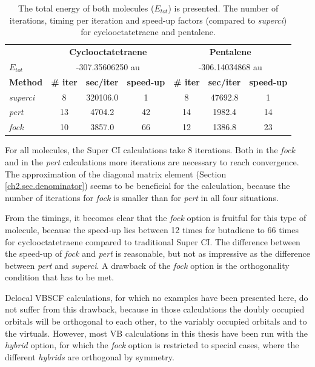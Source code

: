 \begin{table}[htbp]
\caption{The total energy of both molecules ($E_{tot}$) is presented. The number of iterations, timing per iteration and speed-up factors (compared to \textit{superci}) for cyclooctatetraene and pentalene.}
\begin{center}
\begin{tabular}{l c c c c c c}
\hline
&\multicolumn{3}{c}{\textbf{Cyclooctatetraene}}&\multicolumn{3}{c}{\textbf{Pentalene}}\\
$E_{tot}$&\multicolumn{3}{c}{-307.35606250 au}&\multicolumn{3}{c}{-306.14034868 au}\\
\textbf{Method}&\textbf{\# iter}&\textbf{sec/iter}&\textbf{speed-up}&\textbf{\# iter}&\textbf{sec/iter}&\textbf{speed-up}\\
\hline
\textit{superci}&8&320106.0&1&8&47692.8&1\\
\textit{pert}&13&4704.2&42&14&1982.4&14\\
\textit{fock}&10&3857.0&66&12&1386.8&23\\
\end{tabular}
\label{ch2.tab.flat2}
\end{center}
\end{table}

For all molecules, the Super CI calculations take 8 iterations. Both in the \textit{fock} and in the \textit{pert} calculations more iterations are necessary to reach convergence. The approximation of the diagonal matrix element (Section \ref{ch2.sec.denominator}) seems to be beneficial for the calculation, because the number of iterations for \textit{fock} is smaller than for \textit{pert} in all four situations.

From the timings, it becomes clear that the \textit{fock} option is fruitful for this type of molecule, because the speed-up lies between 12 times for butadiene to 66 times for cyclooctatetraene compared to traditional Super CI. The difference between the speed-up of \textit{fock} and \textit{pert} is reasonable, but not as impressive as the difference between \textit{pert} and \textit{superci}. A drawback of the \textit{fock} option is the orthogonality condition that has to be met. 

Delocal VBSCF calculations, for which no examples have been presented here, do not suffer from this drawback, because in those calculations the doubly occupied orbitals will be orthogonal to each other, to the variably occupied orbitals and to the virtuals. However, most VB calculations in this thesis have been run with the \textit{hybrid} option, for which the \textit{fock} option is restricted to special cases, where the different \textit{hybrids} are orthogonal by symmetry.

